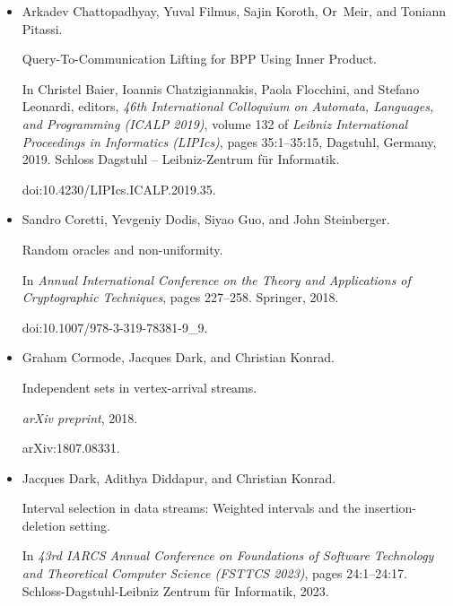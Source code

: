 \begin{itemize}
doi:10.1137/1.9781611974331.CH94.





\item[] 
[19]

Arkadev Chattopadhyay, Yuval Filmus, Sajin Koroth, Or Meir, and Toniann
Pitassi.


Query-To-Communication Lifting for BPP Using Inner Product.


In Christel Baier, Ioannis Chatzigiannakis, Paola Flocchini, and
Stefano Leonardi, editors, \emph{46th International Colloquium on Automata,
Languages, and Programming (ICALP 2019)}, volume 132 of \emph{Leibniz
International Proceedings in Informatics (LIPIcs)}, pages 35:1–35:15,
Dagstuhl, Germany, 2019. Schloss Dagstuhl – Leibniz-Zentrum für
Informatik.


doi:10.4230/LIPIcs.ICALP.2019.35.





\item[] 
[20]

Sandro Coretti, Yevgeniy Dodis, Siyao Guo, and John Steinberger.


Random oracles and non-uniformity.


In \emph{Annual International Conference on the Theory and
Applications of Cryptographic Techniques}, pages 227–258. Springer, 2018.


doi:10.1007/978-3-319-78381-9\_9.





\item[] 
[21]

Graham Cormode, Jacques Dark, and Christian Konrad.


Independent sets in vertex-arrival streams.


\emph{arXiv preprint}, 2018.


arXiv:1807.08331.





\item[] 
[22]

Jacques Dark, Adithya Diddapur, and Christian Konrad.


Interval selection in data streams: Weighted intervals and the
insertion-deletion setting.


In \emph{43rd IARCS Annual Conference on Foundations of Software
Technology and Theoretical Computer Science (FSTTCS 2023)}, pages
24:1–24:17. Schloss-Dagstuhl-Leibniz Zentrum für Informatik, 2023.



\end{itemize}
